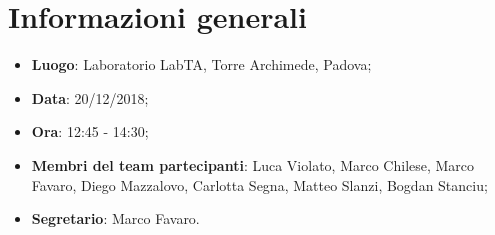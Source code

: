 \section{Informazioni generali}
\begin{itemize}
	\item \textbf{Luogo}: Laboratorio LabTA, Torre Archimede, Padova; 
	\item \textbf{Data}: 20/12/2018; 
	\item \textbf{Ora}: 12:45 - 14:30; 
	\item \textbf{Membri del team partecipanti}: Luca Violato, Marco Chilese, Marco Favaro, 
	Diego Mazzalovo, Carlotta Segna, Matteo Slanzi, Bogdan Stanciu; 
	\item \textbf{Segretario}: Marco Favaro. 
\end{itemize}






